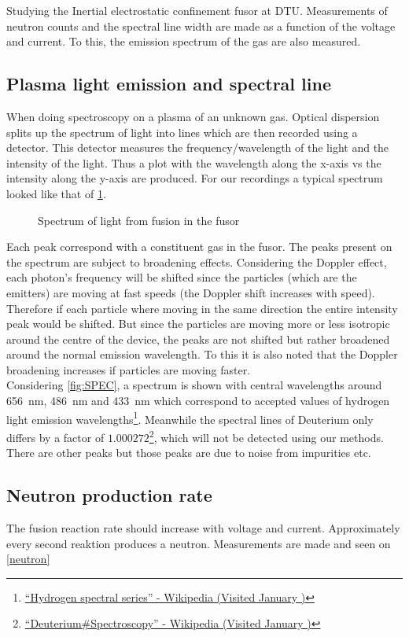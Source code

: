 Studying the Inertial electrostatic confinement fusor at DTU. Measurements of neutron counts and the spectral line width are made as a function of the voltage and current. To this, the emission spectrum of the gas are also measured.
\subsection{Plasma light emission and spectral line}
When doing spectroscopy on a plasma of an unknown gas. Optical dispersion splits up the spectrum of light into lines which are then recorded using a detector. This detector measures the frequency/wavelength of the light and the intensity of the light. Thus a plot with the wavelength along the x-axis vs the intensity along the y-axis are produced. For our recordings a typical spectrum looked like that of \cref{SPEC}.
\begin{figure}[H]
	\centering
	\caption{Spectrum of light from fusion in the fusor}
	\label{SPEC}
\end{figure}
Each peak correspond with a constituent gas in the fusor.
The peaks present on the spectrum are subject to broadening effects. Considering the Doppler effect, each photon's frequency will be shifted since the particles (which are the emitters) are moving at fast speeds (the Doppler shift increases with speed). Therefore if each particle where moving in the same direction the entire intensity peak would be shifted. But since the particles are moving more or less isotropic around the centre of the device, the peaks are not shifted but rather broadened around the normal emission wavelength. To this it is also noted that the Doppler broadening increases if particles are moving faster.\\
Considering \cref{fig:SPEC}, a spectrum is shown with central wavelengths around \SI{656}{\nano\meter}, \SI{486}{\nano\meter} and \SI{433}{\nano\meter} which correspond to accepted values of hydrogen light emission wavelengths\footnote{\href{https://en.wikipedia.org/wiki/Hydrogen_spectral_series}{``Hydrogen spectral series'' - Wikipedia (Visited January )}}. Meanwhile the spectral lines of Deuterium only differs by a factor of $1.000272$\footnote{\href{https://en.wikipedia.org/wiki/Deuterium#Spectroscopy}{``Deuterium\#Spectroscopy'' - Wikipedia (Visited January )}}, which will not be detected using our methods. There are other peaks but those peaks are due to noise from impurities etc.\\



\subsection{Neutron production rate}
The fusion reaction rate should increase with voltage and current. Approximately every second reaktion produces a neutron. Measurements are made and seen on \cref{neutron}
